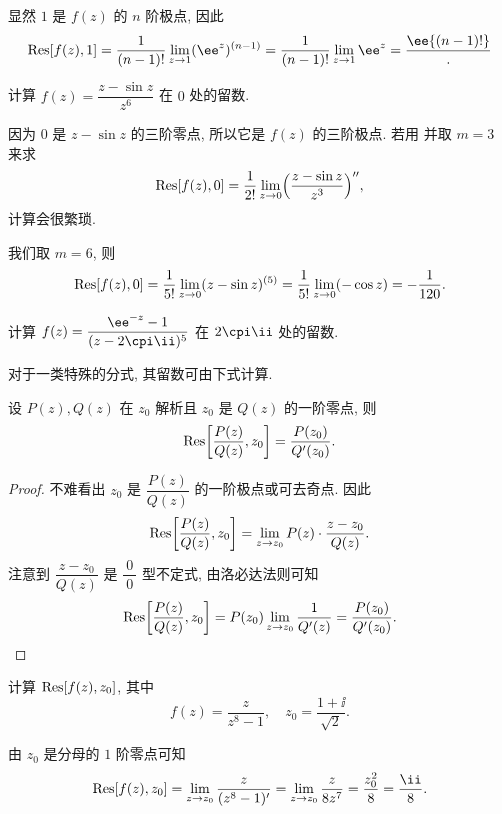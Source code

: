 \begin{solution}
  显然 $1$ 是 $f(z)$ 的 $n$ 阶极点, 因此
  \[
     \Res[f(z),1]
    =\frac1{(n-1)!}\lim_{z\ra 1}(\ee^z)^{(n-1)}
    =\frac1{(n-1)!}\lim_{z\ra 1}\ee^z
    =\frac\ee{(n-1)!}.
  \]
\end{solution}

\begin{example}
  计算 $f(z)=\dfrac{z-\sin z}{z^6}$ 在 $0$ 处的留数.
\end{example}

\begin{solution}
  因为 $0$ 是 $z-\sin z$ 的三阶零点, 所以它是 $f(z)$ 的三阶极点.
  若用 并取 $m=3$ 来求
  \[
     {\mathrm{Res}}[f(z),0]
    =\frac1{2!}\lim_{z\rightarrow0}\Bigl(\frac{z-\sin z}{z^3}\Bigr)'',
  \]
  计算会很繁琐.
  
  我们取 $m=6$, 则
  \[
     {\mathrm{Res}}[f(z),0]
    =\frac1{5!}\lim_{z\rightarrow 0}(z-\sin z)^{(5)}
    =\frac1{5!}\lim_{z\rightarrow 0}(-\cos z)
    =-\frac1{120}.
  \]
\end{solution}

\begin{exercise}
  计算 $f(z)=\dfrac{\ee^{-z}-1}{(z-2\cpi\ii)^5}$ 在 $2\cpi\ii$ 处的留数.
\end{exercise}

对于一类特殊的分式, 其留数可由下式计算.

\begin{theorem}
  设 $P(z),Q(z)$ 在 $z_0$ 解析且 $z_0$ 是 $Q(z)$ 的一阶零点, 则
  \[
     {\mathrm{Res}}\biggl[\frac{P(z)}{Q(z)},z_0\biggr]
    =\frac{P(z_0)}{Q'(z_0)}.
  \]
\end{theorem}

\begin{proof}
  不难看出 $z_0$ 是 $\dfrac{P(z)}{Q(z)}$ 的一阶极点或可去奇点. 因此
  \[
    {\mathrm{Res}}\biggl[\frac{P(z)}{Q(z)},z_0\biggr]
    =\lim_{z\rightarrow z_0}P(z)\cdot \frac{z-z_0}{Q(z)}.
  \]
  注意到 $\dfrac{z-z_0}{Q(z)}$ 是 $\dfrac{~0~}0$ 型不定式, 由洛必达法则可知
  \[
     {\mathrm{Res}}\biggl[\frac{P(z)}{Q(z)},z_0\biggr]
    =P(z_0)\lim_{z\rightarrow z_0}\frac1{Q'(z)}
    =\frac{P(z_0)}{Q'(z_0)}.\qedhere
  \]
\end{proof}

\begin{example}
  计算 ${\mathrm{Res}}[f(z),z_0]$, 其中
  \[
    f(z)=\dfrac{z}{z^8-1},\quad z_0=\frac{1+\ii}{\sqrt2}.
  \]
\end{example}

\begin{solution}
  由 $z_0$ 是分母的 $1$ 阶零点可知
  \[
     \Res[f(z),z_0]
    =\lim_{z\ra z_0}\frac z{(z^8-1)'}
    =\lim_{z\ra z_0}\frac z{8z^7}
    =\frac{z_0^2}8
    =\frac\ii8.
  \]
\end{solution}


